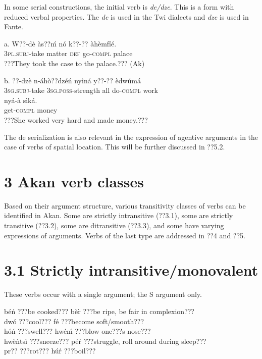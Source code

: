 \documentclass[output=paper]{langsci/langscibook}
\begin{document}
In some serial constructions, the initial verb is \emph{de/dze}. This is a form with reduced verbal properties. The \emph{de }is used in the Twi dialects and \emph{dze} is used in Fante. 

\ea
\gll a.  W??-dè    às??ḿ  nó  k??-??    àhèmfíé.\\
       \textsc{3pl.subj}{}-take  matter  \textsc{def}  go-\textsc{compl}  palace\\
\glt   ???They took the case to the palace.??? (Ak)
\z

\ea
\gll  b.  ??{}-dzè    n-áhò??dzéń    nyìná  y??-??     èdwúmá \\
       \textsc{3sg.subj}{}-take  \textsc{3sg.poss}{}-strength  all  do-\textsc{compl}  work\\
\gll   nyá-à    sìká.\\
       get-\textsc{compl}  money\\
\glt   ???She worked very hard and made money.???
\z

The de serialization is also relevant in the expression of agentive arguments in the case of verbs of spatial location. This will be further discussed in ??5.2.

\section[3  Akan verb classes]{3  Akan verb classes}

Based on their argument structure, various transitivity classes of verbs can be identified in Akan. Some are strictly intransitive (??3.1), some are strictly transitive (??3.2), some are ditransitive (??3.3), and some have varying expressions of arguments. Verbs of the last type are addressed in ??4 and ??5.

\section{3.1  Strictly intransitive/monovalent}

These verbs occur with a single argument; the S argument only.


\ea
béń   \textup{???be cooked???}     bè\`{r}   \textup{???be ripe, be fair in complexion???}   \\
dwó   \textup{???cool??? }      fé   \textup{???become soft/smooth???}  \\
hóń   \textup{???swell???}     hwéḿ   \textup{???blow one???s nose???} \\
hwèǹtsì   \textup{???sneeze???}     pé\'{r}   \textup{???struggle, roll around during sleep???}\\
pr??   \textup{???rot???}       hú\'{r}   \textup{???boil???} \\
\z
\end{document}
